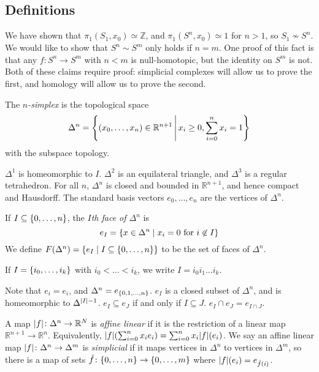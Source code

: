 \subsection{Definitions}
We have shown that \( \pi_1(S_1,x_0) \simeq \mathbb Z \), and \( \pi_1(S^n,x_0) \simeq 1 \) for \( n > 1 \), so \( S_1 \not\sim S^n \).
We would like to show that \( S^n \sim S^m \) only holds if \( n = m \).
One proof of this fact is that any \( f \colon S^n \to S^m \) with \( n < m \) is null-homotopic, but the identity on \( S^m \) is not.
Both of these claims require proof: simplicial complexes will allow us to prove the first, and homology will allow us to prove the second.
\begin{definition}
	The \emph{\( n \)-simplex} is the topological space
	\[ \Delta^n  = \qty{(x_0, \dots, x_n) \in \mathbb R^{n+1} \,\middle|\,x_i \geq 0, \sum_{i=0}^n x_i = 1 } \]
	with the subspace topology.
\end{definition}
\begin{remark}
	\( \Delta^1 \) is homeomorphic to \( I \).
	\( \Delta^2 \) is an equilateral triangle, and \( \Delta^3 \) is a regular tetrahedron.
	For all \( n \), \( \Delta^n \) is closed and bounded in \( \mathbb R^{n+1} \), and hence compact and Hausdorff.
	The standard basis vectors \( e_0, \dots, e_n \) are the vertices of \( \Delta^n \).
\end{remark}
\begin{definition}
	If \( I \subseteq \qty{0, \dots, n} \), the \emph{\( I \)th face of \( \Delta^n \)} is
	\[ e_I = \qty{x \in \Delta^n \mid x_i = 0 \text{ for } i \not\in I} \]
	We define \( F(\Delta^n) = \qty{e_I \mid I \subseteq \qty{0,\dots, n}} \) to be the set of faces of \( \Delta^n \).
\end{definition}
If \( I = \qty{i_0, \dots, i_k} \) with \( i_0 < \dots < i_k \), we write \( I = i_0i_1\dots i_k \).
\begin{remark}
	Note that \( e_{\qty{i}} = e_i \), and \( \Delta^n = e_{\qty{0,1, \dots, n}} \).
	\( e_I \) is a closed subset of \( \Delta^n \), and is homeomorphic to \( \Delta^{\abs{I} - 1} \).
	\( e_I \subseteq e_J \) if and only if \( I \subseteq J \).
	\( e_I \cap e_J = e_{I \cap J} \).
\end{remark}
\begin{definition}
	A map \( \abs{f} \colon \Delta^n \to \mathbb R^N \) is \emph{affine linear} if it is the restriction of a linear map \( \mathbb R^{n+1} \to \mathbb R^n \).
	Equivalently, \( \abs{f}\qty(\sum_{i=0}^n x_i e_i) = \sum_{i=0}^n x_i \abs{f}(e_i) \).
	We say an affine linear map \( \abs{f} \colon \Delta^n \to \Delta^m \) is \emph{simplicial} if it maps vertices in \( \Delta^n \) to vertices in \( \Delta^m \), so there is a map of sets \( \hat f \colon \qty{0,\dots, n} \to \qty{0, \dots, m} \) where \( \abs{f}(e_i) = e_{\hat f(i)} \).
\end{definition}
